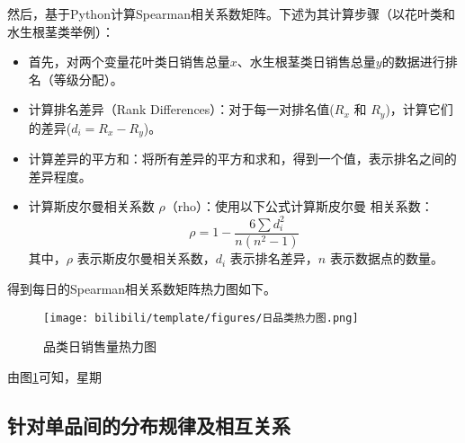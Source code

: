 \documentclass[withoutpreface,bwprint]{cumcmthesis} %
\begin{document}
然后，基于Python计算Spearman相关系数矩阵。下述为其计算步骤（以花叶类和水生根茎类举例）：
\begin{itemize}
\item 首先，对两个变量花叶类日销售总量$x$、水生根茎类日销售总量$y$的数据进行排名（等级分配）。
  
\item 计算排名差异（Rank Differences）：对于每一对排名值($R_x$ 和 $R_y$)，计算它们的差异($d_i = R_x - R_y$)。
  
\item 计算差异的平方和：将所有差异的平方和求和，得到一个值，表示排名之间的差异程度。
  
\item 计算斯皮尔曼相关系数 $\rho$（rho）：使用以下公式计算斯皮尔曼
  相关系数：
 \begin{equation}
    \rho = 1 - \frac{6\sum d_i^2}{n(n^2 - 1)}
  \end{equation}
其中，$\rho$ 表示斯皮尔曼相关系数，$d_i$ 表示排名差异，$n$ 表示数据点的数量。
\end{itemize}
得到每日的Spearman相关系数矩阵热力图如下。
\begin{figure}[H]%
	\centering
	\texttt{[image: bilibili/template/figures/日品类热力图.png]}%
    \caption{品类日销售量热力图}
    \label{日品类热力图}%
\end{figure}
由图\ref{日品类热力图}可知，星期

\subsection{针对单品间的分布规律及相互关系}
\end{document}

